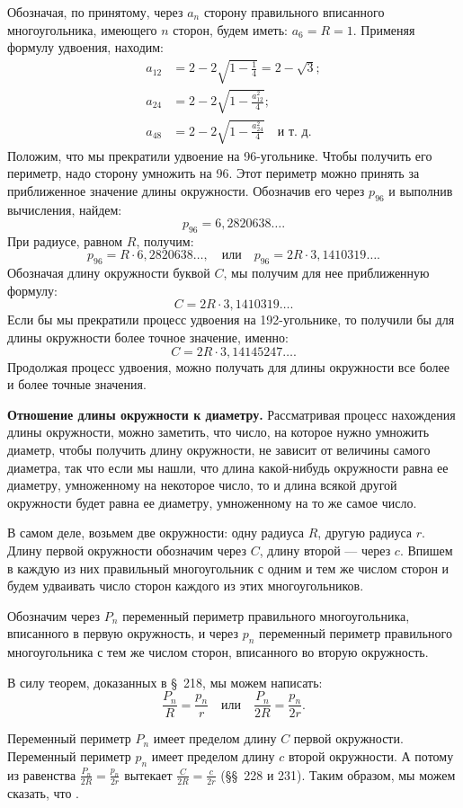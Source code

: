 \documentclass[oneside]{book}
\begin{document}
Обозначая, по принятому, через $a_n$ сторону правильного вписанного многоугольника, имеющего $n$ сторон, будем иметь:
$a_6=R=1$.
Применяя формулу удвоения, находим:
\begin{align*}
a_{12}&=2-2\sqrt{1-\tfrac14}=2-\sqrt3;
\\
a_{24}&=2-2\sqrt{1-\tfrac{a_{12}^2}{4}};
\\
a_{48}&=2-2\sqrt{1-\tfrac{a_{24}^2}{4}}\quad\text{и т.~д.}
\end{align*}
Положим, что мы прекратили удвоение на 96-угольнике.
Чтобы получить его периметр, надо сторону умножить на 96.
Этот периметр можно принять за приближенное значение длины окружности.
Обозначив его через $p_{96}$ и выполнив вычисления, найдем:
\[p_{96} = 6{,}2820638\dots.\]
При радиусе, равном $R$, получим:
\[p_{96}=R\cdot6{,}2820638\dots,
\quad\text{или}\quad
p_{96}=2R\cdot3{,}1410319\dots.\]
Обозначая длину окружности буквой $C$, мы получим для нее приближенную формулу:
\[C=2R\cdot3{,}1410319\dots.\]
Если бы мы прекратили процесс удвоения на 192-угольнике, то получили бы для длины окружности более точное значение, именно:
\[C=2R\cdot3{,}14145247\dots.\]
Продолжая процесс удвоения, можно получать для длины окружности все более и более точные значения.

\textbf{Отношение длины окружности к диаметру.}
Рассматривая процесс нахождения длины окружности, можно заметить, что число, на которое нужно умножить диаметр, чтобы получить длину окружности, не зависит от величины самого диаметра, так что если мы нашли, что длина какой-нибудь окружности равна ее диаметру, умноженному на некоторое число, то и длина всякой другой окружности будет равна ее диаметру, умноженному на то же самое число.

В самом деле, возьмем две окружности:
одну радиуса $R$, другую радиуса $r$.
Длину первой окружности обозначим через $C$, длину второй — через $c$.
Впишем в каждую из них правильный многоугольник с одним и тем же числом сторон и будем удваивать число сторон каждого из этих многоугольников.

Обозначим через $P_n$ переменный периметр правильного многоугольника, вписанного в первую окружность, и через $p_n$ переменный периметр правильного многоугольника с тем же числом сторон, вписанного во вторую окружность.

В силу теорем, доказанных в §~218, мы можем написать:
\[\frac{P_n}{R}=\frac{p_n}{r}
\quad\text{или}\quad
\frac{P_n}{2R}=\frac{p_n}{2r}.\]

Переменный периметр $P_n$ имеет пределом длину $C$ первой окружности.
Переменный периметр $p_n$ имеет пределом длину $c$ второй окружности.
А потому из равенства $\frac{P_n}{2R}=\frac{p_n}{2r}$ вытекает $\frac{C}{2R}=\frac{c}{2r}$
(§§~228 и 231).
Таким образом, мы можем сказать, что .
\end{document}
